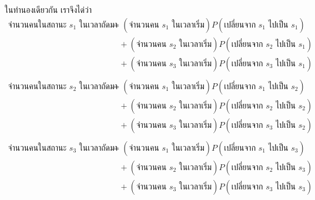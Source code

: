 ในทำนองเดียวกัน เราจึงได่ว่า
\begin{align*}
    \text{จำนวน}\text{คนในสถานะ $s_1$ ในเวลาถัดมา}
            &= (\text{จำนวนคน $s_1$ ในเวลาเริ่ม})P(\text{เปลี่ยนจาก $s_1$ ไปเป็น $s_1$}) \\
            &\quad+ (\text{จำนวนคน $s_2$ ในเวลาเริ่ม})P(\text{เปลี่ยนจาก $s_2$ ไปเป็น $s_1$})\\
            &\quad+ (\text{จำนวนคน $s_3$ ในเวลาเริ่ม})P(\text{เปลี่ยนจาก $s_3$ ไปเป็น $s_1$})\\
            ~\\
    \text{จำนวน}\text{คนในสถานะ $s_2$ ในเวลาถัดมา}
            &= (\text{จำนวนคน $s_1$ ในเวลาเริ่ม})P(\text{เปลี่ยนจาก $s_1$ ไปเป็น $s_2$}) \\
            &\quad+ (\text{จำนวนคน $s_2$ ในเวลาเริ่ม})P(\text{เปลี่ยนจาก $s_2$ ไปเป็น $s_2$})\\
            &\quad+ (\text{จำนวนคน $s_3$ ในเวลาเริ่ม})P(\text{เปลี่ยนจาก $s_3$ ไปเป็น $s_2$})\\
            ~\\
    \text{จำนวน}\text{คนในสถานะ $s_3$ ในเวลาถัดมา}
            &= (\text{จำนวนคน $s_1$ ในเวลาเริ่ม})P(\text{เปลี่ยนจาก $s_1$ ไปเป็น $s_3$}) \\
            &\quad+ (\text{จำนวนคน $s_2$ ในเวลาเริ่ม})P(\text{เปลี่ยนจาก $s_2$ ไปเป็น $s_3$})\\
            &\quad+ (\text{จำนวนคน $s_3$ ในเวลาเริ่ม})P(\text{เปลี่ยนจาก $s_3$ ไปเป็น $s_3$})
\end{align*}

